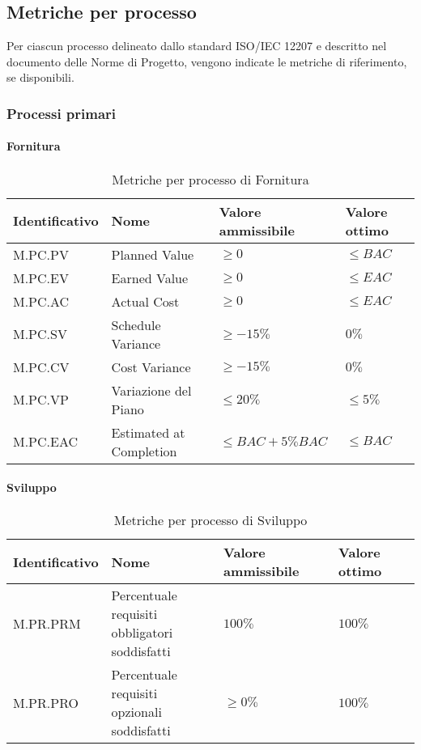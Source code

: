 \subsection{Metriche per processo}
\label{subsec:processi_metriche}
Per ciascun processo delineato dallo standard ISO/IEC 12207 e descritto nel documento delle Norme di Progetto, 
vengono indicate le metriche di riferimento, se disponibili.

\subsubsection{Processi primari}
\paragraph{Fornitura}
\begin{table}[H]
    \centering
    \begin{tabular}{| l | l | l | l |}
    \hline
    \textbf{Identificativo} & 
    \textbf{Nome} &
    \textbf{Valore ammissibile} &
    \textbf{Valore ottimo}\\
    \hline
        M.PC.PV & Planned Value & $\geq 0$ & $\leq BAC$ \\
    \hline
        M.PC.EV & Earned Value & $\geq 0$ & $\leq EAC$ \\
    \hline
        M.PC.AC & Actual Cost & $\geq 0$ & $\leq EAC$ \\
    \hline
        M.PC.SV & Schedule Variance & $\geq -15\%$ & $0\%$ \\
    \hline
        M.PC.CV & Cost Variance & $\geq -15\%$ & $0\%$ \\
    \hline  
        M.PC.VP & Variazione del Piano & $\leq 20\%$ & $\leq 5\%$ \\
    \hline
        M.PC.EAC & Estimated at Completion & $\leq BAC+5\% BAC$ & $\leq BAC$ \\
    \hline
\end{tabular}
\caption{Metriche per processo di Fornitura}
\label{tab:metriche_fornitura} 
\end{table}

\paragraph{Sviluppo}
\begin{table}[H]
    \centering
    \begin{tabular}{| l | l | l | l |}
    \hline
    \textbf{Identificativo} & 
    \textbf{Nome} &
    \textbf{Valore ammissibile} &
    \textbf{Valore ottimo}\\
    \hline
        M.PR.PRM & \makecell{Percentuale requisiti \\ obbligatori soddisfatti} & $100\%$ & $100\%$ \\
    \hline
        M.PR.PRO & \makecell{Percentuale requisiti \\ opzionali soddisfatti} & $\geq 0\%$ & $100\%$ \\
    \hline    
\end{tabular}
\caption{Metriche per processo di Sviluppo}
\label{tab:metriche_sviluppo} 
\end{table}

